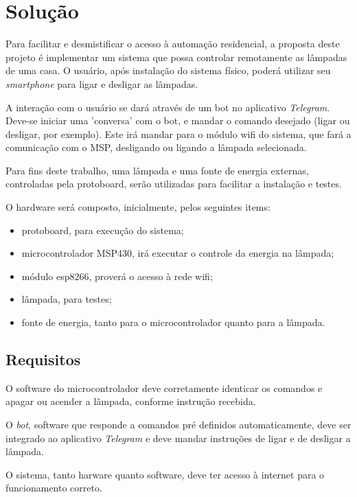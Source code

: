 \documentclass[12pt,journal,compsoc]{IEEEtran}
\begin{document}
\section{Solução}

Para facilitar e desmistificar o acesso à automação residencial, a proposta deste projeto é implementar um sistema que possa controlar remotamente as lâmpadas de uma casa. O usuário, após instalação do sistema físico, poderá utilizar seu \emph{smartphone} para ligar e desligar as lâmpadas.

A interação com o usuário se dará através de um bot no aplicativo \emph{Telegram}. Deve-se iniciar uma 'conversa' com o bot, e mandar o comando desejado (ligar ou desligar, por exemplo). Este irá mandar para o módulo wifi do sistema, que fará a comunicação com o MSP, desligando ou ligando a lâmpada selecionada.

Para fins deste trabalho, uma lâmpada e uma fonte de energia externas, controladas pela protoboard, serão utilizadas para facilitar a instalação e testes.

O hardware será composto, inicialmente, pelos seguintes items:

\begin{itemize}
\item protoboard, para execução do sistema;
\item microcontrolador MSP430, irá executar o controle da energia na lâmpada;
\item módulo esp8266, proverá o acesso à rede wifi;
\item lâmpada, para testes;
\item fonte de energia, tanto para o microcontrolador quanto para a lâmpada.
\end{itemize}

\subsection{Requisitos}

O software do microcontrolador deve corretamente identicar os comandos e apagar ou acender a lâmpada, conforme instrução recebida.

O \emph{bot}, software que responde a comandos pré definidos automaticamente, deve ser integrado ao aplicativo \textit{Telegram} e deve mandar instruções de ligar e de desligar a lâmpada.

O sistema, tanto harware quanto software, deve ter acesso à internet para o funcionamento correto.




\end{document}
